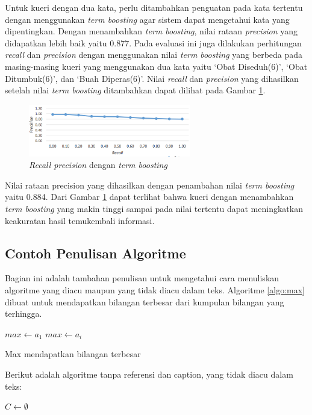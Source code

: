\vfill\eject %
Untuk kueri dengan dua kata, perlu ditambahkan penguatan pada kata tertentu dengan menggunakan \textit{term boosting} agar sistem dapat mengetahui kata yang dipentingkan. Dengan menambahkan \textit{term boosting}, nilai rataan \textit{precision} yang didapatkan lebih baik yaitu 0.877. Pada evaluasi ini juga dilakukan perhitungan \textit{recall} dan \textit{precision} dengan menggunakan nilai \textit{term boosting} yang berbeda pada masing-masing kueri yang menggunakan dua kata yaitu ‘Obat Diseduh(6)’, ‘Obat Ditumbuk(6)’, dan ‘Buah Diperas(6)’. Nilai \textit{recall} dan \textit{precision} yang dihasilkan setelah nilai \textit{term boosting} ditambahkan dapat dilihat pada Gambar \ref{fig:boosting2}.
\begin{figure}[h!]\centering 
\includegraphics[width=200pt]{boosting2.png}
\caption{\textit{Recall precision} dengan \textit{term boosting}}
\label{fig:boosting2}
\end{figure}

Nilai rataan precision yang dihasilkan dengan penambahan nilai \textit{term boosting} yaitu 0.884. Dari Gambar \ref{fig:boosting2} dapat terlihat bahwa kueri dengan menambahkan \textit{term boosting} yang makin tinggi sampai pada nilai tertentu dapat meningkatkan keakuratan hasil temukembali informasi.

\subsection*{Contoh Penulisan Algoritme}
Bagian ini adalah tambahan penulisan untuk mengetahui cara menuliskan algoritme yang diacu maupun yang tidak diacu dalam teks. Algoritme \ref{algo:max} dibuat untuk mendapatkan bilangan terbesar dari kumpulan bilangan yang terhingga.
\begin{algorithm}
\DontPrintSemicolon %
$max \gets a_1$\;
 {
   {
    $max \gets a_i$\;
  }
}
\;
\caption{{\sc Max} mendapatkan bilangan terbesar}
\label{algo:max}
\end{algorithm}

\vfill\eject %
\noindent Berikut adalah algoritme tanpa referensi dan caption, yang tidak diacu dalam teks:
\begin{algorithm}
\DontPrintSemicolon %
$C \gets \emptyset$\;
\;
\end{algorithm}
